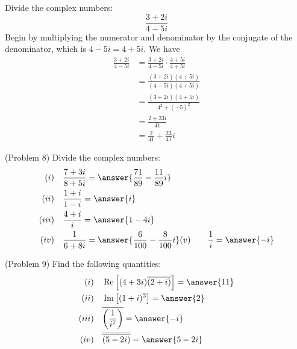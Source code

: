 \documentclass[handout]{ximera}
\begin{document}
\begin{example}[Example 8]
Divide the complex numbers:
\[
\frac{3+2i}{4-5i} 
\]
Begin by multiplying the numerator and denominator by the conjugate of the denominator, 
which is $\overline {4-5i} = 4+5i$.
We have
\begin{align*}
\frac{3+2i}{4-5i} &= \frac{3+2i}{4-5i} \cdot \frac{4+5i}{4+5i} \\[9 pt]
                  &= \frac{(3+2i)(4+5i)}{(4-5i)(4+5i)}\\[9pt]
									&= \frac{(3+2i)(4+5i)}{4^2 +(-5)^2}\\[8pt]
                  &= \frac{2+23i}{41}\\[7pt]
                  &= \frac{2}{41} + \frac{23}{41}i
\end{align*}
\end{example}


\begin{problem}(Problem 8)
Divide the complex numbers:
\begin{align*}
(i)& \quad  \frac{7+3i}{8+5i} = \answer{\frac{71}{89} -\frac{11}{89}i}\\
(ii)& \quad\frac{1+i}{1-i} = \answer{i}\\
(iii)& \quad\frac{4+i}{i} = \answer{1-4i}\\
(iv)& \quad\frac{1}{6+8i} = \answer{\frac{6}{100} - \frac{8}{100}i}
(v)&\quad \frac{1}{i} = \answer{-i}
\end{align*}
\end{problem}


\begin{problem}(Problem 9)
Find the following quantities:
\begin{align*}
(i)& \quad \Rep\left[(4+3i)\overline{(2+i)}\right] = \answer{11}\\
(ii)& \quad \Imp\left[(1+i)^3\right] = \answer{2}\\
(iii)& \quad \overline{\left(\frac{1}{i^7}\right)} = \answer{-i}\\
(iv)& \quad \overline{\overline{(5-2i)}} = \answer{5-2i}
\end{align*}
\end{problem}
\end{document}
